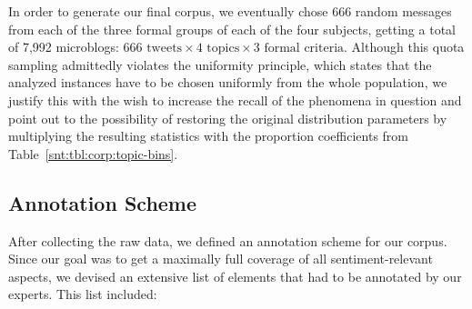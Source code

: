 
In order to generate our final corpus, we eventually chose 666 random
messages from each of the three formal groups of each of the four
subjects, getting a total of 7,992 microblogs: $666\text{ tweets}
\times 4\text{ topics} \times 3\text{ formal criteria}$.  Although
this quota sampling admittedly violates the uniformity principle,
which states that the analyzed instances have to be chosen uniformly
from the whole population, we justify this with the wish to increase
the recall of the phenomena in question and point out to the
possibility of restoring the original distribution parameters by
multiplying the resulting statistics with the proportion coefficients
from Table~\ref{snt:tbl:corp:topic-bins}.

\subsection{Annotation Scheme}\label{subsec:snt:ascheme}
After collecting the raw data, we defined an annotation scheme for our
corpus. Since our goal was to get a maximally full coverage of all
sentiment-relevant aspects, we devised an extensive list of elements
that had to be annotated by our experts.  This list included:

